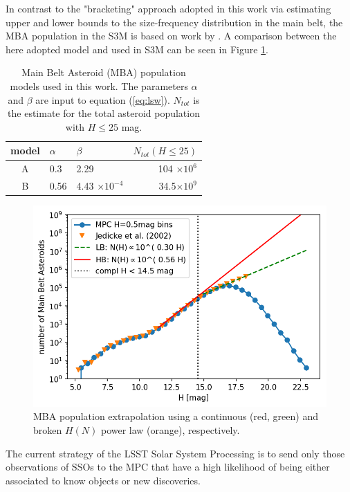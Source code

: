In contrast to the "bracketing" approach adopted in this work via estimating upper and lower bounds to the size-frequency distribution in the main belt, the MBA population in the S3M is based on work by \citet{jedicke2002}. A comparison between the here adopted model and \citet{jedicke2002} used in S3M can be seen in Figure \ref{fig:mba_pop}.
\begin{table}[t!]
\begin{center}
\begin{tabular}{cllr}
\hline
model & $\alpha$ & $\beta$ & $N_{tot}(H \le 25)$ \\
\hline
A & 0.3 &  2.29 & 104 $\times 10^{6}$ \\
B & 0.56 &4.43 $\times 10^{-4}$ & 34.5$\times 10^{9}$\\
\hline
\end{tabular}
\end{center}
\caption{Main Belt Asteroid (MBA) population models used in this work. The parameters $\alpha$ and $\beta$ are input to equation (\ref{eq:lsw}). $N_{tot}$ is the estimate for the total asteroid population with $H\le 25$ mag. }
\label{tab:mbapop}
\end{table}
\begin{figure}[b!]
\begin{center}
\includegraphics[scale=.8]{figs/mpc_population_4.png}
\end{center}
\caption{MBA population extrapolation using a continuous (red, green) and broken $H(N)$ power law (orange), respectively.}
\label{fig:mba_pop}       %
\end{figure} 
%
The current strategy of the \gls{LSST} Solar System Processing is to send only those observations of SSOs to the \gls{MPC} that have a high likelihood of being either associated to know objects or new discoveries. 
